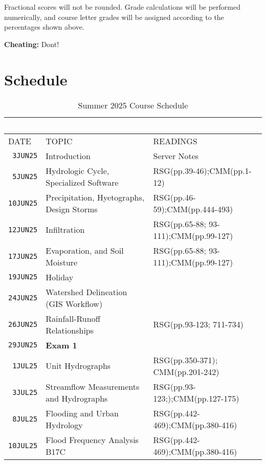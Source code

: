 \documentclass[12pt]{article}
\begin{document}
Fractional scores will not be rounded. Grade calculations will be performed numerically, and course letter grades will be assigned according to the percentages shown above.

\textbf{Cheating:} Dont!

\clearpage
\section*{Schedule}
\begin{table}[ht!]
   \centering
   \caption{Summer 2025 Course Schedule}
   \begin{tabular}{p{0.5in}p{3.0in}p{3.0in}} 
   ~ & ~ & ~  \\
\hline
DATE & TOPIC & READINGS  \\
\hline
\texttt{~3JUN25} & Introduction & Server Notes  \\ %
\texttt{~5JUN25} & Hydrologic Cycle, Specialized Software & RSG(pp.39-46);CMM(pp.1-12) \\ %
\texttt{10JUN25} & Precipitation, Hyetographs, Design Storms & RSG(pp.46-59);CMM(pp.444-493)\\ %
\texttt{12JUN25} & Infiltration & RSG(pp.65-88; 93-111);CMM(pp.99-127)\\ %
\texttt{17JUN25} & Evaporation, and Soil Moisture &  RSG(pp.65-88; 93-111);CMM(pp.99-127)\\ %
\texttt{19JUN25} & Holiday & \\ %
\texttt{24JUN25} & Watershed Delineation (GIS Workflow) & \\ %
\texttt{26JUN25} & Rainfall-Runoff Relationships & RSG(pp.93-123; 711-734)\\
\texttt{29JUN25} & \textbf{Exam 1} &  \\ %
\texttt{~1JUL25} & Unit Hydrographs & RSG(pp.350-371); CMM(pp.201-242)\\
\texttt{~3JUL25} & Streamflow Measurements and Hydrographs & RSG(pp.93-123;);CMM(pp.127-175) \\ 
\texttt{~8JUL25} & Flooding and Urban Hydrology & RSG(pp.442-469);CMM(pp.380-416)\\ 
\texttt{10JUL25} & Flood Frequency Analysis B17C & RSG(pp.442-469);CMM(pp.380-416) \\   

\end{tabular}
\end{table}
\end{document}
